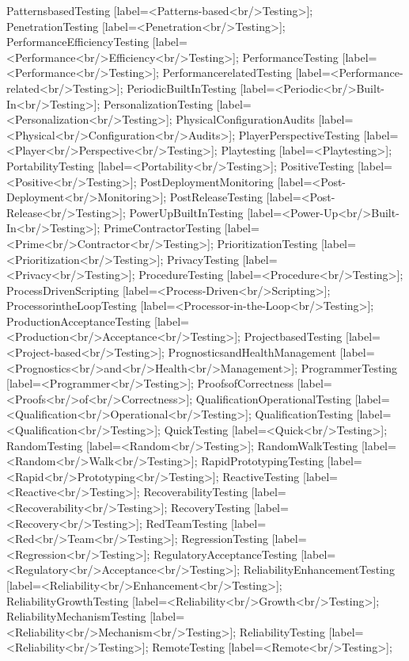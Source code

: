 \documentclass{article}
\begin{document}
{PatternsbasedTesting [label=<Patterns-based<br/>Testing>];
PenetrationTesting [label=<Penetration<br/>Testing>];
PerformanceEfficiencyTesting [label=<Performance<br/>Efficiency<br/>Testing>];
PerformanceTesting [label=<Performance<br/>Testing>];
PerformancerelatedTesting [label=<Performance-related<br/>Testing>];
PeriodicBuiltInTesting [label=<Periodic<br/>Built-In<br/>Testing>];
PersonalizationTesting [label=<Personalization<br/>Testing>];
PhysicalConfigurationAudits [label=<Physical<br/>Configuration<br/>Audits>];
PlayerPerspectiveTesting [label=<Player<br/>Perspective<br/>Testing>];
Playtesting [label=<Playtesting>];
PortabilityTesting [label=<Portability<br/>Testing>];
PositiveTesting [label=<Positive<br/>Testing>];
PostDeploymentMonitoring [label=<Post-Deployment<br/>Monitoring>];
PostReleaseTesting [label=<Post-Release<br/>Testing>];
PowerUpBuiltInTesting [label=<Power-Up<br/>Built-In<br/>Testing>];
PrimeContractorTesting [label=<Prime<br/>Contractor<br/>Testing>];
PrioritizationTesting [label=<Prioritization<br/>Testing>];
PrivacyTesting [label=<Privacy<br/>Testing>];
ProcedureTesting [label=<Procedure<br/>Testing>];
ProcessDrivenScripting [label=<Process-Driven<br/>Scripting>];
ProcessorintheLoopTesting [label=<Processor-in-the-Loop<br/>Testing>];
ProductionAcceptanceTesting [label=<Production<br/>Acceptance<br/>Testing>];
ProjectbasedTesting [label=<Project-based<br/>Testing>];
PrognosticsandHealthManagement [label=<Prognostics<br/>and<br/>Health<br/>Management>];
ProgrammerTesting [label=<Programmer<br/>Testing>];
ProofsofCorrectness [label=<Proofs<br/>of<br/>Correctness>];
QualificationOperationalTesting [label=<Qualification<br/>Operational<br/>Testing>];
QualificationTesting [label=<Qualification<br/>Testing>];
QuickTesting [label=<Quick<br/>Testing>];
RandomTesting [label=<Random<br/>Testing>];
RandomWalkTesting [label=<Random<br/>Walk<br/>Testing>];
RapidPrototypingTesting [label=<Rapid<br/>Prototyping<br/>Testing>];
ReactiveTesting [label=<Reactive<br/>Testing>];
RecoverabilityTesting [label=<Recoverability<br/>Testing>];
RecoveryTesting [label=<Recovery<br/>Testing>];
RedTeamTesting [label=<Red<br/>Team<br/>Testing>];
RegressionTesting [label=<Regression<br/>Testing>];
RegulatoryAcceptanceTesting [label=<Regulatory<br/>Acceptance<br/>Testing>];
ReliabilityEnhancementTesting [label=<Reliability<br/>Enhancement<br/>Testing>];
ReliabilityGrowthTesting [label=<Reliability<br/>Growth<br/>Testing>];
ReliabilityMechanismTesting [label=<Reliability<br/>Mechanism<br/>Testing>];
ReliabilityTesting [label=<Reliability<br/>Testing>];
RemoteTesting [label=<Remote<br/>Testing>];
}
\end{document}

